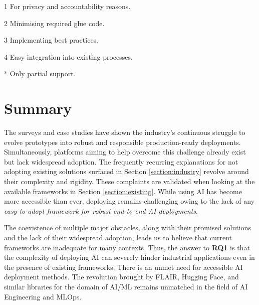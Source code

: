 \begin{table}
\begin{threeparttable}
\begin{tablenotes}
\item[1] For privacy and accountability reasons. \cite{bosch2021engineering}
\item[2] Minimising required glue code. \cite{sculley2015hidden}
\item[3] Implementing best practices. \cite{serban2020adoption,serban2021practices,john2020architecting}
\item[4] Easy integration into existing processes. \cite{haakman2021ai,thiee2021systematic}
\item[*] Only partial support.
\end{tablenotes}
\end{threeparttable}
\end{table}

\section{Summary}

The surveys and case studies have shown the industry's continuous struggle to evolve prototypes into robust and responsible production-ready deployments. Simultaneously, platforms aiming to help overcome this challenge already exist but lack widespread adoption. The frequently recurring explanations for not adopting existing solutions surfaced in Section \ref{section:industry} revolve around their complexity and rigidity. These complaints are validated when looking at the available frameworks in Section \ref{section:existing}. While using AI has become more accessible than ever, deploying remains challenging owing to the lack of any \textit{easy-to-adopt framework for robust end-to-end AI deployments}.

The coexistence of multiple major obstacles, along with their promised solutions and the lack of their widespread adoption, leads us to believe that current frameworks are inadequate for many contexts. Thus, the answer to \textbf{RQ1} is that the complexity of deploying AI can severely hinder industrial applications even in the presence of existing frameworks. There is an unmet need for accessible AI deployment methods. The revolution brought by FLAIR, Hugging Face, and similar libraries for the domain of AI/ML remains unmatched in the field of AI Engineering and MLOps.
